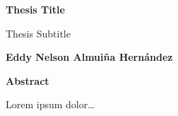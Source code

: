 \thispagestyle{plain}
\begin{center}
    \Large
    \textbf{Thesis Title}

    \vspace{0.4cm}
    \large
    Thesis Subtitle

    \vspace{0.4cm}
    \textbf{Eddy Nelson Almuiña Hernández}

    \vspace{0.9cm}
    \textbf{Abstract}
\end{center}
Lorem ipsum dolor\ldots